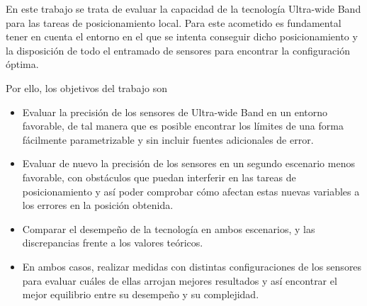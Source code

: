 En este trabajo se trata de evaluar la capacidad de la tecnología Ultra-wide Band para las tareas de posicionamiento local.
Para este acometido es fundamental tener en cuenta el entorno en el que se intenta conseguir dicho posicionamiento y la disposición de todo el entramado de sensores para encontrar la configuración óptima.

Por ello, los objetivos del trabajo son
\begin{itemize}
    \item Evaluar la precisión de los sensores de Ultra-wide Band en un entorno favorable, de tal manera que es posible encontrar los límites de una forma fácilmente parametrizable y sin incluir fuentes adicionales de error.
    \item Evaluar de nuevo la precisión de los sensores en un segundo escenario menos favorable, con obstáculos que puedan interferir en las tareas de posicionamiento y así poder comprobar cómo afectan estas nuevas variables a los errores en la posición obtenida.
    \item Comparar el desempeño de la tecnología en ambos escenarios, y las discrepancias frente a los valores teóricos.
    \item En ambos casos, realizar medidas con distintas configuraciones de los sensores para evaluar cuáles de ellas arrojan mejores resultados y así encontrar el mejor equilibrio entre su desempeño y su complejidad.
\end{itemize}